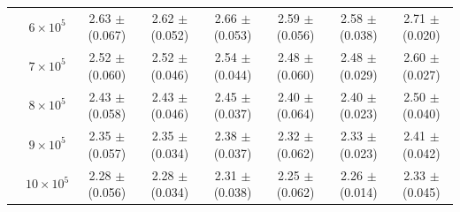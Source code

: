 \documentclass[10pt,journal,compsoc]{IEEEtran}
\begin{document}
\begin{table}
\begin{tabular}{c|c|c|c|c|c|c|c}
 & $6 \times 10^5 $ & 2.63 $\pm$ (0.067) & 2.62 $\pm$ (0.052) & 2.66 $\pm$ (0.053) & 2.59 $\pm$ (0.056) & 2.58 $\pm$ (0.038) & 2.71 $\pm$ (0.020)  \\
 & $7 \times 10^5 $ & 2.52 $\pm$ (0.060) & 2.52 $\pm$ (0.046) & 2.54 $\pm$ (0.044) & 2.48 $\pm$ (0.060) & 2.48 $\pm$ (0.029) & 2.60 $\pm$ (0.027)  \\
 & $8 \times 10^5 $ & 2.43 $\pm$ (0.058) & 2.43 $\pm$ (0.046) & 2.45 $\pm$ (0.037) & 2.40 $\pm$ (0.064) & 2.40 $\pm$ (0.023) & 2.50 $\pm$ (0.040)  \\
 & $9 \times 10^5 $ & 2.35 $\pm$ (0.057) & 2.35 $\pm$ (0.034) & 2.38 $\pm$ (0.037) & 2.32 $\pm$ (0.062) & 2.33 $\pm$ (0.023) & 2.41 $\pm$ (0.042)  \\
 & $10 \times 10^5 $ & 2.28 $\pm$ (0.056) & 2.28 $\pm$ (0.034) & 2.31 $\pm$ (0.038) & 2.25 $\pm$ (0.062) & 2.26 $\pm$ (0.014) & 2.33 $\pm$ (0.045)  \\
\hline \hline
\end{tabular}
\vspace{-2ex}
\end{table}
\end{document}
